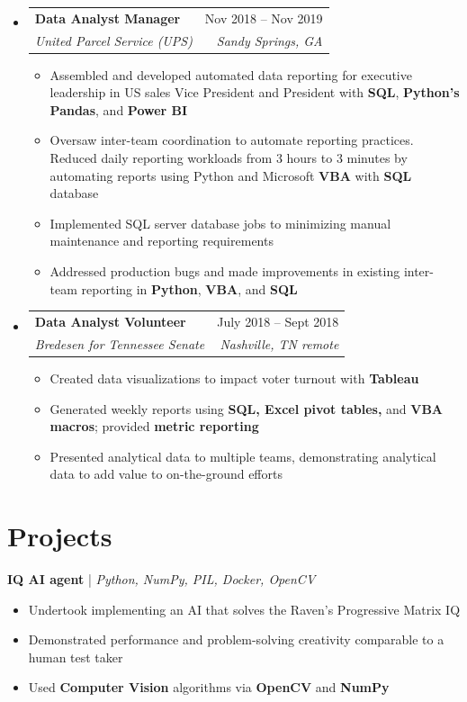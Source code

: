 \documentclass[12pt, letterpaper]{article}
\makeatletter
\newcommand{\resumeItem}[1]{
  \item\small{
    {#1 \vspace{-2pt}}
  }
}
\newcommand{\resumeSubheading}[4]{
  \vspace{-2pt}\item
    \begin{tabular*}{0.97\textwidth}[t]{l@{\extracolsep{\fill}}r}
      \textbf{#1} & #2 \\
      \textit{\small#3} & \textit{\small #4} \\
    \end{tabular*}\vspace{-7pt}
}
\newcommand{\resumeSubSubheading}[2]{
    \item
    \begin{tabular*}{0.97\textwidth}{l@{\extracolsep{\fill}}r}
      \textit{\small#1} & \textit{\small #2} \\
    \end{tabular*}\vspace{-7pt}
}
\newcommand{\resumeSubHeadingListStart}{\begin{itemize}[leftmargin=0.15in, label={}]}
\newcommand{\resumeSubHeadingListEnd}{\end{itemize}}
\newcommand{\resumeItemListStart}{\begin{itemize}} %
\newcommand{\resumeItemListEnd}{\end{itemize}\vspace{-16pt}}
\makeatother
\begin{document}
\resumeSubHeadingListStart
  \resumeSubheading
    {Data Analyst Manager}{Nov 2018 -- Nov 2019}
    {United Parcel Service (UPS)}{Sandy Springs, GA}
    \resumeItemListStart
      \resumeItem{Assembled and developed automated data reporting for executive leadership in US sales Vice President and President with \textbf{SQL}, \textbf{Python's Pandas}, and \textbf{Power BI}}
      \resumeItem{Oversaw inter-team coordination to automate reporting practices. Reduced daily reporting workloads from 3 hours to 3 minutes by automating reports using Python and Microsoft \textbf{VBA} with \textbf{SQL} database}
      \resumeItem{Implemented SQL server database jobs to minimizing manual maintenance and reporting requirements}
      \resumeItem{Addressed production bugs and made improvements in existing inter-team reporting in \textbf{Python}, \textbf{VBA}, and \textbf{SQL}}
    \resumeItemListEnd
    \resumeSubHeadingListEnd

\resumeSubHeadingListStart
  \resumeSubheading
    {Data Analyst Volunteer}{July 2018 -- Sept 2018}
    {Bredesen for Tennessee Senate}{Nashville, TN remote}
    \resumeItemListStart
      \resumeItem{Created data visualizations to impact voter turnout with \textbf{Tableau}}
      \resumeItem{Generated weekly reports using \textbf{SQL, Excel pivot tables,} and \textbf{VBA macros}; provided \textbf{metric reporting}}
      \resumeItem{Presented analytical data to multiple teams, demonstrating analytical data to add value to on-the-ground efforts}
    \resumeItemListEnd
\resumeSubHeadingListEnd

\vspace{2pt}



\section{Projects}
\textbf{IQ AI agent} | \small\textit{Python, NumPy, PIL, Docker, OpenCV}
\begin{itemize}[noitemsep,topsep=0pt]
  \item Undertook implementing an AI that solves the Raven's Progressive Matrix IQ
  \item Demonstrated performance and problem-solving creativity comparable to a human test taker
  \item Used \textbf{Computer Vision} algorithms via \textbf{OpenCV} and \textbf{NumPy}
\end{itemize}
\end{document}
